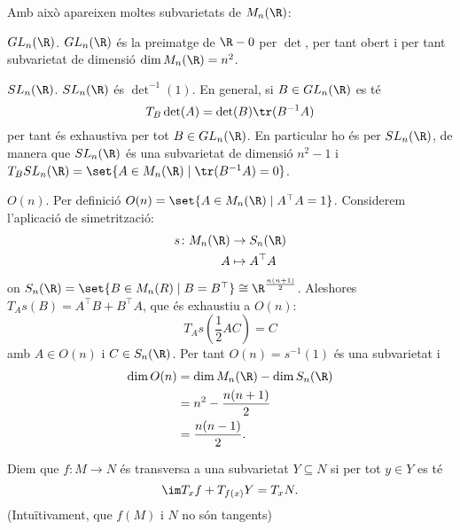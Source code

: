 \documentclass[12pt,twocolumn]{article}
\begin{document}
\begin{example}
	Amb això apareixen moltes subvarietats de \( M_n(\R) \):
	\begin{points}
	\item \( GL_n(\R) \). \( GL_n(\R) \) és la preimatge de \( \R - 0 \) per \( \det \), per
		tant obert i per tant subvarietat de dimensió \( \dim M_n(\R) = n^2 \). 
	\item \( SL_n(\R) \). \( SL_n(\R) \) és \( \det^{-1}(1) \). En general, si \( B \in
		GL_n(\R) \) es té
		\begin{equation*}
			T_B \det (A) = \det(B) \tr(B^{-1}A)
		\end{equation*}
		per tant és exhaustiva per tot \( B \in GL_n(\R) \). En particular ho és per \(
		SL_n(\R) \), de manera que \( SL_n(\R) \) és una subvarietat de dimensió \( n^2 - 1
		\) i \( T_B SL_n(\R) = \set{A \in M_n(\R) \mid \tr(B^{-1}A) = 0} \).
		
	\item \( O(n) \). Per definició \( O(n) = \set{A \in M_n(\R) \mid A^\top A = 1} \).
		Considerem l'aplicació de simetrització:
		\begin{align*}
			s \colon M_n(\R) & \to S_n(\R) \\
			A & \mapsto A^\top A
		\end{align*}
	on \(  S_n(\R) = \set{B \in M_n(R) \mid B = B^\top} \cong \R^{\frac{n(n+1)}{2}} \).
	Aleshores \( T_As(B) = A^\top B + B^\top A \), que és exhaustiu a \( O(n) \):
	\begin{equation*}
		T_A s\left(\frac{1}{2}AC\right) = C
	\end{equation*}
	amb \( A \in O(n) \) i \( C \in S_n(\R) \). Per tant \( O(n) = s^{-1}(1) \) és una
	subvarietat i 
	\begin{align*}
		\dim O(n) & = \dim M_n(\R) - \dim S_n(\R) \\
							& = n^2 - \frac{n(n+1)}{2} \\ 
							& = \frac{n(n-1)}{2}.
	\end{align*}
	\end{points}
\end{example}

\begin{definition}[Transversalitat]
	Diem que \( f \colon M \to N \) és transversa a una subvarietat \( Y \subseteq N \) si
	per tot \( y \in Y \) es té
	\begin{equation*}
		\im T_x f + T_{f(x)} Y = T_x N.
	\end{equation*}
	(Intuïtivament, que \( f(M) \) i \( N \) no són tangents)
\end{definition}
\end{document}
